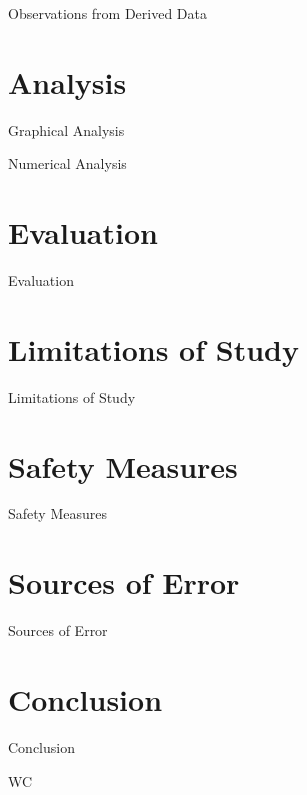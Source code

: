 \documentclass[12pt, a4paper]{report}
\begin{document}
        {Observations from Derived Data}
        
\chapter{{Analysis}}
        
        {Graphical Analysis}
        
        {Numerical Analysis}
        
\chapter{{Evaluation}}
        
        {Evaluation}
        
\chapter{{Limitations of Study}}
        
        {Limitations of Study}
    
\chapter{{Safety Measures}}
        
        {Safety Measures} 
                
\chapter{{Sources of Error}}
        
        {Sources of Error}
        
\chapter{{Conclusion}}
        
        {Conclusion}
        

        
\clearpage


{WC}



\end{document}
